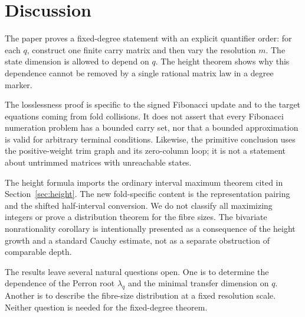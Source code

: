 \section{Discussion}
\label{sec:discussion}

The paper proves a fixed-degree statement with an explicit quantifier order:
for each \(q\), construct one finite carry matrix and then vary the resolution
\(m\).  The state dimension is allowed to depend on \(q\).  The height theorem
shows why this dependence cannot be removed by a single rational matrix law in
a degree marker.

The losslessness proof is specific to the signed Fibonacci update and to the
target equations coming from fold collisions.  It does not assert that every
Fibonacci numeration problem has a bounded carry set, nor that a bounded
approximation is valid for arbitrary terminal conditions.  Likewise, the
primitive conclusion uses the positive-weight trim graph and its zero-column
loop; it is not a statement about untrimmed matrices with unreachable states.

The height formula imports the ordinary interval maximum theorem cited in
Section~\ref{sec:height}.  The new fold-specific content is the representation
pairing and the shifted half-interval conversion.  We do not classify all
maximizing integers or prove a distribution theorem for the fibre sizes.
The bivariate nonrationality corollary is intentionally presented as a
consequence of the height growth and a standard Cauchy estimate, not as a
separate obstruction of comparable depth.

The results leave several natural questions open.  One is to determine the
dependence of the Perron root \(\lambda_q\) and the minimal transfer dimension
on \(q\).  Another is to describe the fibre-size distribution at a fixed
resolution scale.  Neither question is needed for the fixed-degree theorem.

